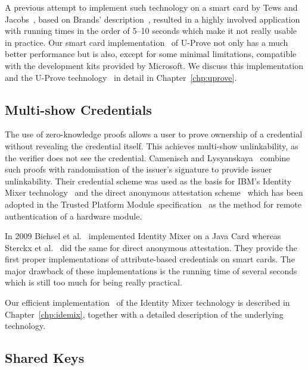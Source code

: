 A previous attempt to implement such technology on a smart card by Tews and
Jacobs~\cite{TewsJacobs09}, based on Brands' description~\cite{Brands2000},
resulted in a highly involved application with running times in the order of
5--10 seconds which make it not really usable in practice. Our smart card
implementation~\cite{MostowskiVullers11} of U-Prove not only has a much better
performance but is also, except for some minimal limitations, compatible with
the development kits provided by Microsoft. We discuss this implementation and
the U-Prove technology~\cite{U-Prove_Crypto2013} in detail in
Chapter~\ref{chp:uprove}.

\subsection{Multi-show Credentials}

The use of zero-knowledge proofs allows a user to prove ownership of a credential
without revealing the credential itself. This achieves multi-show unlinkability,
as the verifier does not see the credential. Camenisch and
Lysyanskaya~\cite{CamenischLysyanskaya2001,CamenischLysyanskaya2003} combine
such proofs with randomisation of the issuer's signature to provide issuer
unlinkability. Their credential scheme was used as the basis for IBM's Identity
Mixer technology~\cite{IdemixCrypto2012} and the direct anonymous attestation
scheme~\cite{BrickellCC04} which has been adopted in the Trusted Platform Module
specification~\cite{TPM_1.2} as the method for remote authentication of a
hardware module.

In 2009 Bichsel et al.~\cite{BichselCGS2009} implemented Identity Mixer on a
Java Card whereas Sterckx et al.~\cite{Sterckx09} did the same for direct
anonymous attestation. They provide the first proper implementations of
attribute-based credentials on smart cards. The major drawback of these
implementations is the running time of several seconds which is still too much
for being really practical.

Our efficient implementation~\cite{VullersAlpar2013} of the Identity Mixer
technology is described in Chapter~\ref{chp:idemix}, together with a detailed
description of the underlying technology.

\subsection{Shared Keys\label{sec:nPA}}

